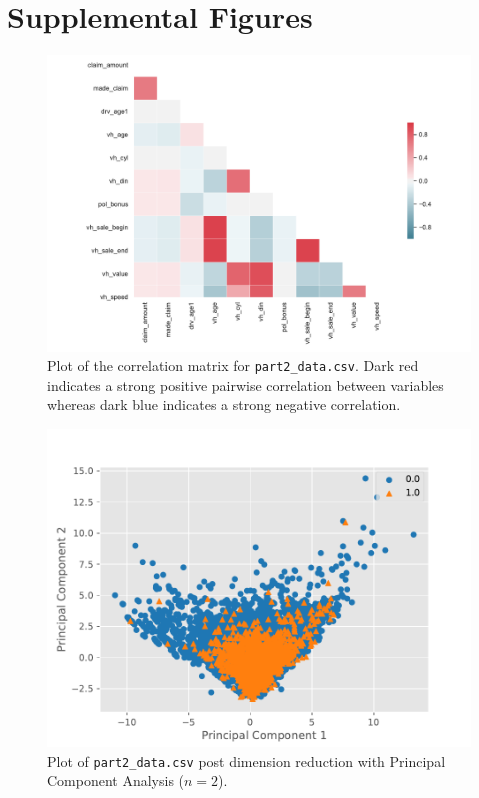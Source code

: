 \section{Supplemental Figures}
\label{app:figures}

\begin{figure}[h!]
    \ContinuedFloat*
    \centering
    \includegraphics[width = 0.7\hsize]{./figures/corrplot.pdf}
    \caption[Correlation Matrix of Explanatory Variables]{Plot of the correlation matrix for \texttt{part2\_data.csv}. Dark red indicates a strong positive pairwise correlation between variables whereas dark blue indicates a strong negative correlation.}
    \label{fig:corrplot}
\end{figure}

\begin{figure}[h!]
    \ContinuedFloat*
    \centering
    \includegraphics[width = 0.7\hsize]{./figures/pca.pdf}
    \caption[Scatter Plot of Explantory Variables post-Principal Component Analysis ($n=2$)]{Plot of \texttt{part2\_data.csv} post dimension reduction with Principal Component Analysis ($n=2$).}
    \label{fig:pca}
\end{figure}

